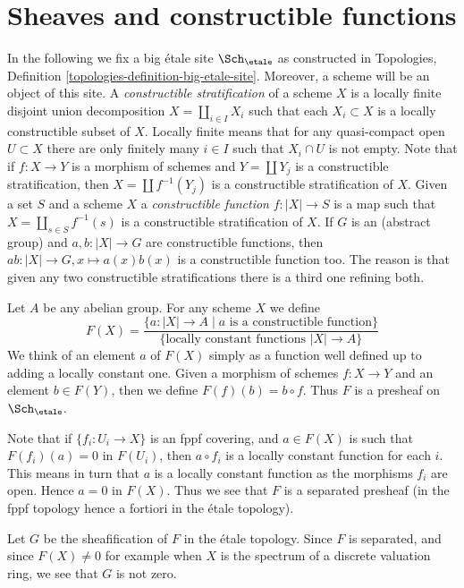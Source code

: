 \section{Sheaves and constructible functions}
\label{section-constructible-functions}

\noindent
In the following we fix a big \'etale site $\Sch_\etale$
as constructed in
Topologies, Definition \ref{topologies-definition-big-etale-site}.
Moreover, a scheme will be an object of this site.
A {\it constructible stratification}
of a scheme $X$ is a locally finite disjoint union decomposition
$X = \coprod_{i \in I} X_i$ such that each $X_i \subset X$ is a
locally constructible subset of $X$. Locally finite means that
for any quasi-compact open $U \subset X$ there are only finitely
many $i \in I$ such that $X_i \cap U$ is not empty.
Note that if $f : X \to Y$ is a morphism of schemes and
$Y = \coprod Y_j$ is a constructible stratification, then
$X = \coprod f^{-1}(Y_j)$ is a constructible stratification of $X$.
Given a set $S$ and a scheme $X$ a {\it constructible function}
$f : |X| \to S$ is a map such that $X = \coprod_{s \in S} f^{-1}(s)$
is a constructible stratification of $X$.
If $G$ is an (abstract group) and $a, b : |X| \to G$ are constructible
functions, then $ab : |X| \to G, x \mapsto a(x)b(x)$ is a constructible
function too. The reason is that given any two constructible stratifications
there is a third one refining both.

\medskip\noindent
Let $A$ be any abelian group. For any scheme $X$ we define
$$
F(X) =
\frac{\{a : |X| \to A \mid a \text{ is a constructible function}\}}{\{\text{locally constant functions }|X| \to A\}}
$$
We think of an element $a$ of $F(X)$ simply as a function well defined
up to adding a locally constant one. Given a morphism of schemes
$f : X \to Y$ and an element $b \in F(Y)$, then we define
$F(f)(b) = b \circ f$. Thus $F$ is a presheaf on $\Sch_\etale$.

\medskip\noindent
Note that if $\{f_i : U_i \to X\}$ is an fppf covering, and $a \in F(X)$
is such that $F(f_i)(a) = 0$ in $F(U_i)$, then $a \circ f_i$ is a locally
constant function for each $i$. This means in turn that $a$ is a locally
constant function as the morphisms $f_i$ are open. Hence $a = 0$ in $F(X)$.
Thus we see that $F$ is a separated presheaf (in the fppf topology
hence a fortiori in the \'etale topology).

\medskip\noindent
Let $G$ be the sheafification of $F$ in the \'etale topology.
Since $F$ is separated, and since $F(X) \not = 0$ for example when
$X$ is the spectrum of a discrete valuation ring, we see that $G$
is not zero.

